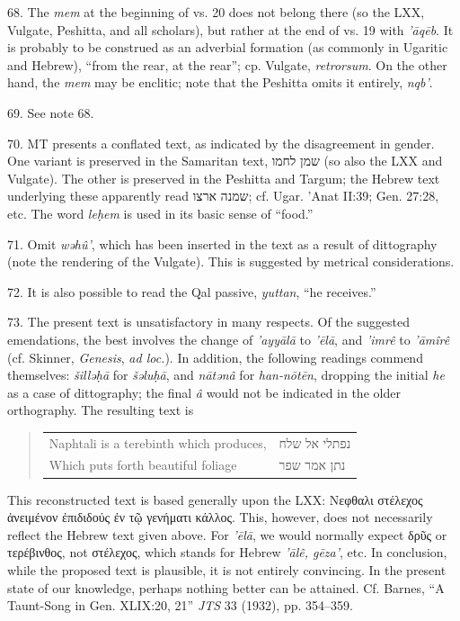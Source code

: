 \begin{enumerate}
68. The \emph{mem} at the beginning of vs. 20 does not belong there (so the
LXX, Vulgate, Peshitta, and all scholars), but rather at the end of vs. 19 with
\emph{'āqēb}. It is probably to be construed as an adverbial formation (as
commonly in Ugaritic and Hebrew), ``from the rear, at the rear''; cp. Vulgate,
\emph{retrorsum}. On the other hand, the \emph{mem} may be enclitic; note that
the Peshitta omits it entirely, \emph{nqb'}.

69. See note 68.

70. MT presents a conflated text, as indicated by the disagreement in gender.
One variant is preserved in the Samaritan text, שמן לחמו (so also the LXX and
Vulgate). The other is preserved in the Peshitta and Targum; the Hebrew text
underlying these apparently read שמנה ארצו; cf. Ugar. 'Anat II:39; Gen. 27:28,
etc. The word \emph{leḥem} is used in its basic sense of ``food.''

71. Omit \emph{wəhû'}, which has been inserted in the text as a result of
dittography (note the rendering of the Vulgate). This is suggested by metrical
considerations.

72. It is also possible to read the Qal passive, \emph{yuttan}, ``he receives.''

73. The present text is unsatisfactory in many respects. Of the suggested
emendations, the best involves the change of \emph{'ayyālā} to \emph{'ēlā},
and \emph{'imrê} to \emph{'āmîrê} (cf. Skinner, \emph{Genesis}, \emph{ad
loc.}). In addition, the following readings commend themselves:
\emph{šilləḥā} for \emph{šəluḥā}, and \emph{nātənâ} for \emph{han-nōtēn},
dropping the initial \emph{he} as a case of dittography; the final \emph{â}
would not be indicated in the older orthography. The resulting text is

\begin{quote}
\begin{tabular}{ll}
Naphtali is a terebinth which produces, & נפתלי אל שלח \\
Which puts forth beautiful foliage & נתן אמר שפר \\
\end{tabular}
\end{quote}

This reconstructed text is based generally upon the LXX: Νεφθαλι στέλεχος
ἀνειμένον ἐπιδιδούς ἐν τῷ γενήματι κάλλος. This, however, does not necessarily
reflect the Hebrew text given above. For \emph{'ēlā}, we would normally expect
δρῦς or τερέβινθος, not στέλεχος, which stands for Hebrew \emph{'ālê, gēza'},
etc. In conclusion, while the proposed text is plausible, it is not entirely
convincing. In the present state of our knowledge, perhaps nothing better can
be attained. Cf. Barnes, ``A Taunt-Song in Gen. XLIX:20, 21'' \emph{JTS} 33
(1932), pp. 354--359.


\end{enumerate}
